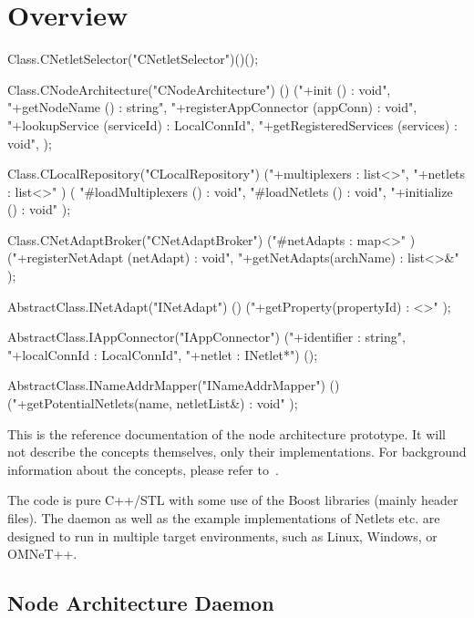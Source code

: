 \chapter{Overview}
\label{ch:classes}

\begin{empcmds}
Class.CNetletSelector("CNetletSelector")()();

Class.CNodeArchitecture("CNodeArchitecture")
	()
	("+init () : void",
	"+getNodeName () : string",
	"+registerAppConnector (appConn) : void",
	"+lookupService (serviceId) : LocalConnId",
	"+getRegisteredServices (services) : void",
	);

Class.CLocalRepository("CLocalRepository")
	("+multiplexers : list<>",
	"+netlets : list<>"
	)
	(
	"#loadMultiplexers () : void",
	"#loadNetlets () : void",
	"+initialize () : void"
	);

Class.CNetAdaptBroker("CNetAdaptBroker")
	("#netAdapts : map<>"
	)
	("+registerNetAdapt (netAdapt) : void",
	"+getNetAdapts(archName) : list<>&"
	);

AbstractClass.INetAdapt("INetAdapt")
	()
	("+getProperty(propertyId) : <>"
	);

AbstractClass.IAppConnector("IAppConnector")
	("+identifier : string",
	"+localConnId : LocalConnId",
	"+netlet : INetlet*")
	();

AbstractClass.INameAddrMapper("INameAddrMapper")
	()
	("+getPotentialNetlets(name, netletList&) : void"
	);

\end{empcmds}


This is the reference documentation of the node architecture prototype. It will not describe the concepts themselves, only their implementations. For background information about the concepts, please refer to~\cite{1000FutureNetworks}.

The code is pure C++/STL with some use of the Boost libraries (mainly header files). The daemon as well as the example implementations of Netlets etc. are designed to run in multiple target environments, such as Linux, Windows, or OMNeT++.


\section{Node Architecture Daemon}
\label{ch:classes:daemon}

